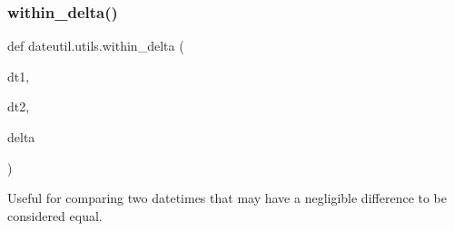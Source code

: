 \subsubsection{\texorpdfstring{within\+\_\+delta()}{within\_delta()}}
{\footnotesize\ttfamily def dateutil.\+utils.\+within\+\_\+delta (\begin{DoxyParamCaption}\item[{}]{dt1,  }\item[{}]{dt2,  }\item[{}]{delta }\end{DoxyParamCaption})}

\begin{DoxyVerb}Useful for comparing two datetimes that may have a negligible difference
to be considered equal.
\end{DoxyVerb}
 